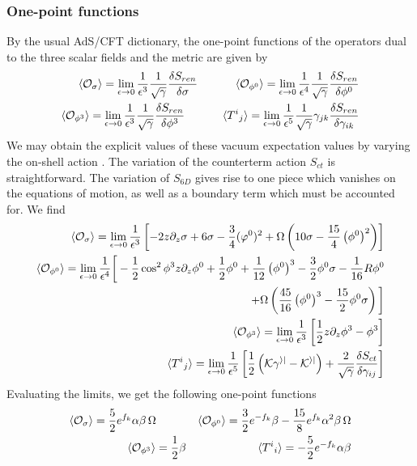 \documentclass[12pt]{article}
\begin{document}
\subsubsection{One-point functions}
By the usual AdS/CFT dictionary, the one-point functions of the operators dual to the three scalar fields and the metric are given by 
\begin{align}
\langle {\cal O}_{\sigma} \rangle = \lim_{\epsilon \rightarrow 0}  \frac{1}{\epsilon^3} {1 \over \sqrt{\gamma}} {\delta S_{ren} \over \delta \sigma}~~~~~~~~~~
\langle {\cal O}_{\phi^0} \rangle = \lim_{\epsilon \rightarrow 0}  \frac{1}{\epsilon^4} {1 \over \sqrt{\gamma}} {\delta S_{ren} \over \delta \phi^0} 
\nonumber\\
 \langle {\cal O}_{\phi^3} \rangle = \lim_{\epsilon \rightarrow 0}  \frac{1}{\epsilon^3} {1 \over \sqrt{\gamma}} {\delta S_{ren} \over \delta \phi^3}~~~~~~~~~~
 \langle {T^i}_j \rangle  = \lim_{\epsilon \rightarrow 0}  \frac{1}{\epsilon^5} {1 \over \sqrt{\gamma}} \gamma_{jk}{\delta S_{ren} \over \delta\gamma_{ik}}
\end{align}
We may obtain the explicit values of these vacuum expectation values by varying the on-shell action . The variation of the counterterm action $S_{ct}$ is straightforward. The variation of $S_{6D}$ gives rise to one piece which vanishes on the equations of motion, as well as a boundary term which must be accounted for. We find
\begin{align}
\langle {\cal O}_{\sigma} \rangle = \lim_{\epsilon \rightarrow 0} {1 \over \epsilon^3}  \left[- 2 z \partial_z \sigma + 6\sigma - {3 \over 4}( \varphi^0)^2 +\Omega\left(10\sigma-\frac{15}{4} \left(\phi^0\right)^2\right)  \right]\nonumber \\
\langle {\cal O}_{\phi^0} \rangle = \lim_{\epsilon \rightarrow 0} {1 \over \epsilon^4}  \bigg[- \frac12 \cos^2\phi^3 z \partial_z \phi^0 +\frac12 \phi^0 +\frac{1}{12} \left(\phi^0\right)^3-\frac32 \phi^0\sigma-\frac{1}{16}R\phi^0 \nonumber\\
~~~~~~~~~~~~~~~~~~~~+\Omega\left(\frac{45}{16}\left(\phi^0\right)^3-\frac{15}{2}\phi^0\sigma\right)\bigg]\nonumber \\
\langle {\cal O}_{\phi^3} \rangle = \lim_{\epsilon \rightarrow 0} {1 \over \epsilon^3}  \left[ \frac12 z \partial_z \phi^3-\phi^3\right]\nonumber  \\
\langle {T^i}_j\rangle = \lim_{\epsilon \rightarrow 0} {1 \over \epsilon^5}\left[\frac12 \left(\cal K \gamma^{ij}-\cal K^{ij}\right)+\frac{2}{\sqrt{\gamma}}\frac{\delta S_{ct}}{\delta \gamma_{ij}}\right]
\end{align}
Evaluating the limits, we get the following one-point functions
\begin{align}
\langle {\cal O}_{\sigma} \rangle = \frac52 e^{f_k}\alpha\beta\,\Omega ~~~~~~~~~~~
\langle {\cal O}_{\phi^0} \rangle = \frac32 e^{-f_k} \beta -\frac{15}{8} e^{f_k}\alpha^2\beta\, \Omega
\nonumber\\
 \langle {\cal O}_{\phi^3} \rangle = \frac12 \beta~~~~~~~~~~~~~~~~~~~ \langle {T^i}_i \rangle  =  -\frac52 e^{-f_k} \alpha\beta
\end{align}
\end{document}
